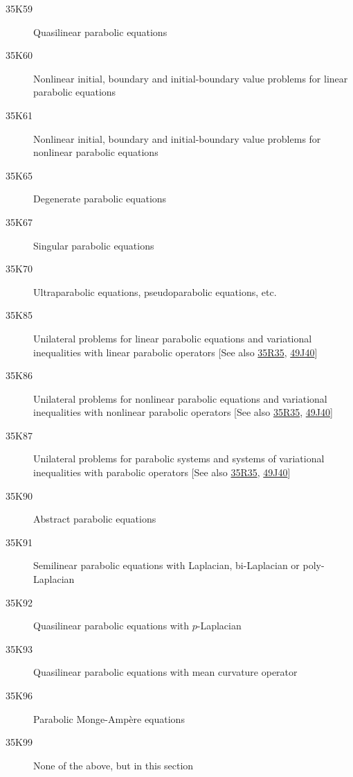\documentclass[letterpaper]{article}
\begin{document}
\begin{description}
\item [35K59]\label{35K59} Quasilinear parabolic equations
\item [35K60]\label{35K60} Nonlinear initial, boundary and initial-boundary value problems for linear parabolic equations
\item [35K61]\label{35K61} Nonlinear initial, boundary and initial-boundary value problems for nonlinear parabolic equations
\item [35K65]\label{35K65} Degenerate parabolic equations
\item [35K67]\label{35K67} Singular parabolic equations
\item [35K70]\label{35K70} Ultraparabolic equations, pseudoparabolic equations, etc.
\item [35K85]\label{35K85} Unilateral problems for linear parabolic equations and variational inequalities with linear parabolic  operators [See also \hyperref[35R35]{35R35}, \hyperref[49J40]{49J40}]
\item [35K86]\label{35K86} Unilateral problems for nonlinear parabolic equations and variational inequalities with nonlinear parabolic  operators [See also \hyperref[35R35]{35R35}, \hyperref[49J40]{49J40}]
\item [35K87]\label{35K87} Unilateral problems for parabolic systems  and systems of variational inequalities with parabolic  operators [See also \hyperref[35R35]{35R35}, \hyperref[49J40]{49J40}]
\item [35K90]\label{35K90} Abstract parabolic equations
\item [35K91]\label{35K91} Semilinear parabolic equations with Laplacian, bi-Laplacian or poly-Laplacian
\item [35K92]\label{35K92} Quasilinear parabolic equations with $p$-Laplacian
\item [35K93]\label{35K93} Quasilinear parabolic equations with mean curvature operator
\item [35K96]\label{35K96} Parabolic Monge-Amp\`{e}re equations
\item [35K99]\label{35K99} None of the above, but in this section
\end{description}
\end{document}
